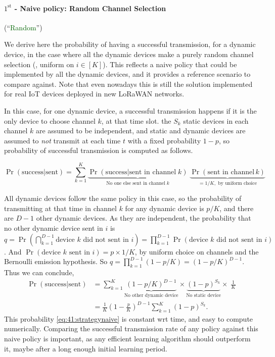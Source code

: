 \paragraph{$1^{\text{st}}$ - Naive policy: Random Channel Selection} (``\textcolor{darkgreen}{Random}'')

We derive here the probability of having a successful transmission, for a dynamic device, in the case where all the dynamic devices make a purely random channel selection (\ie, uniform on $i \in [K]$).
This reflects a naive policy that could be implemented by all the dynamic devices, and it provides a reference scenario to compare against.
Note that even nowadays this is still the solution implemented for real IoT devices deployed in new LoRaWAN networks.

In this case, for one dynamic device, a successful transmission happens if it is the only device to choose channel $k$, at that time slot.
the $S_k$ static devices in each channel $k$ are assumed to be independent, and static and dynamic devices are assumed to \emph{not} transmit at each time $t$ with a fixed probability $1-p$,
so probability of successful transmission is computed as follows.

\begin{equation}
    \Pr(\text{success}|\text{sent}) = \sum_{k=1}^{K} \underbrace{\Pr(\text{success}|\text{sent in channel}\;k)}_{\text{No one else sent in channel}\; k} \; \underbrace{\Pr(\text{sent in channel}\,k)}_{= 1/K, \text{ by uniform choice}}
\end{equation}

All dynamic devices follow the same policy in this case, so the probability of transmitting at that time in channel $k$ for any dynamic device is $p / K$, and there are $D-1$ other dynamic devices.
As they are independent, the probability that no other dynamic device sent in $i$
is $q = \Pr(\bigcap_{k=1}^{D-1} \text{device } k \text{ did not sent in } i) = \prod_{k=1}^{D-1} \Pr(\text{device } k \text{ did not sent in } i)$. And $\Pr(\text{device } k \text{ sent in } i) = p \times 1 / K$, by uniform choice on channels and the Bernoulli emission hypothesis. So $q = \prod_{k=1}^{D-1} (1 - p/K) = (1-p/K)^{D-1}$. Thus we can conclude,
%
\begin{align}\label{eq:41:strategynaive}
    \Pr(\text{success}|\text{sent})
    & = \sum_{k=1}^{K} \underbrace{(1 - p / K)^{D-1}}_{\text{No other dynamic device}} \times \underbrace{(1-p)^{S_k}}_{\text{No static device}} \times\; \frac{1}{K} \nonumber \\
    & = \frac{1}{K} \left(1-\frac{p}{K}\right)^{D-1} \sum_{k=1}^{K} (1-p)^{S_k} .
\end{align}
%
This probability \eqref{eq:41:strategynaive} is constant wrt time, and easy to compute numerically.
Comparing the successful transmission rate of any policy against this naive policy is important, as any efficient learning algorithm should outperform it,
maybe after a long enough initial learning period.


